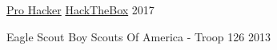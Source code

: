 
\begin{cvhonors}

  \cvhonor
    {\href{https://app.hackthebox.com/profile/activity/3716}{Pro Hacker}} %
    {\href{https://www.hackthebox.com/}{HackTheBox}} %
    {} %
    {2017} %
    
  \cvhonor
    {Eagle Scout} %
    {Boy Scouts Of America - Troop 126} %
    {} %
    {2013} %

\end{cvhonors}